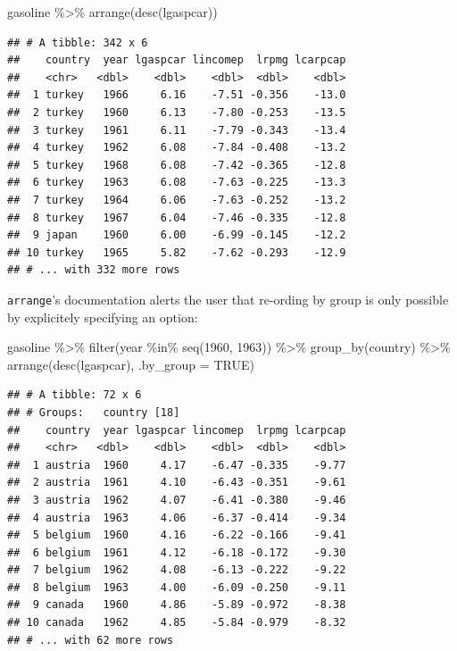 \documentclass[
]{article}
\newenvironment{Shaded}{\begin{snugshade}}{\end{snugshade}}
\newcommand{\AttributeTok}[1]{\textcolor[rgb]{0.77,0.63,0.00}{#1}}
\newcommand{\ConstantTok}[1]{\textcolor[rgb]{0.00,0.00,0.00}{#1}}
\newcommand{\DecValTok}[1]{\textcolor[rgb]{0.00,0.00,0.81}{#1}}
\newcommand{\FunctionTok}[1]{\textcolor[rgb]{0.00,0.00,0.00}{#1}}
\newcommand{\NormalTok}[1]{#1}
\newcommand{\SpecialCharTok}[1]{\textcolor[rgb]{0.00,0.00,0.00}{#1}}
\begin{document}
\begin{Shaded}
\begin{Highlighting}[]
\NormalTok{gasoline }\SpecialCharTok{\%\textgreater{}\%}
  \FunctionTok{arrange}\NormalTok{(}\FunctionTok{desc}\NormalTok{(lgaspcar))}
\end{Highlighting}
\end{Shaded}

\begin{verbatim}
## # A tibble: 342 x 6
##    country  year lgaspcar lincomep  lrpmg lcarpcap
##    <chr>   <dbl>    <dbl>    <dbl>  <dbl>    <dbl>
##  1 turkey   1966     6.16    -7.51 -0.356    -13.0
##  2 turkey   1960     6.13    -7.80 -0.253    -13.5
##  3 turkey   1961     6.11    -7.79 -0.343    -13.4
##  4 turkey   1962     6.08    -7.84 -0.408    -13.2
##  5 turkey   1968     6.08    -7.42 -0.365    -12.8
##  6 turkey   1963     6.08    -7.63 -0.225    -13.3
##  7 turkey   1964     6.06    -7.63 -0.252    -13.2
##  8 turkey   1967     6.04    -7.46 -0.335    -12.8
##  9 japan    1960     6.00    -6.99 -0.145    -12.2
## 10 turkey   1965     5.82    -7.62 -0.293    -12.9
## # ... with 332 more rows
\end{verbatim}

\texttt{arrange}'s documentation alerts the user that re-ording by group is only possible by explicitely
specifying an option:

\begin{Shaded}
\begin{Highlighting}[]
\NormalTok{gasoline }\SpecialCharTok{\%\textgreater{}\%}
  \FunctionTok{filter}\NormalTok{(year }\SpecialCharTok{\%in\%} \FunctionTok{seq}\NormalTok{(}\DecValTok{1960}\NormalTok{, }\DecValTok{1963}\NormalTok{)) }\SpecialCharTok{\%\textgreater{}\%}
  \FunctionTok{group\_by}\NormalTok{(country) }\SpecialCharTok{\%\textgreater{}\%}
  \FunctionTok{arrange}\NormalTok{(}\FunctionTok{desc}\NormalTok{(lgaspcar), }\AttributeTok{.by\_group =} \ConstantTok{TRUE}\NormalTok{)}
\end{Highlighting}
\end{Shaded}

\begin{verbatim}
## # A tibble: 72 x 6
## # Groups:   country [18]
##    country  year lgaspcar lincomep  lrpmg lcarpcap
##    <chr>   <dbl>    <dbl>    <dbl>  <dbl>    <dbl>
##  1 austria  1960     4.17    -6.47 -0.335    -9.77
##  2 austria  1961     4.10    -6.43 -0.351    -9.61
##  3 austria  1962     4.07    -6.41 -0.380    -9.46
##  4 austria  1963     4.06    -6.37 -0.414    -9.34
##  5 belgium  1960     4.16    -6.22 -0.166    -9.41
##  6 belgium  1961     4.12    -6.18 -0.172    -9.30
##  7 belgium  1962     4.08    -6.13 -0.222    -9.22
##  8 belgium  1963     4.00    -6.09 -0.250    -9.11
##  9 canada   1960     4.86    -5.89 -0.972    -8.38
## 10 canada   1962     4.85    -5.84 -0.979    -8.32
## # ... with 62 more rows
\end{verbatim}
\end{document}
